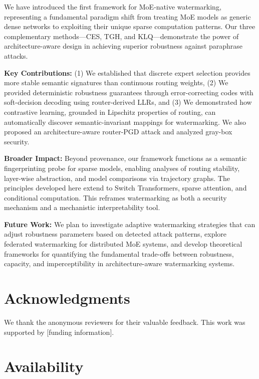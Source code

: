 We have introduced the first framework for MoE-native watermarking, representing a fundamental paradigm shift from treating MoE models as generic dense networks to exploiting their unique sparse computation patterns. Our three complementary methods—CES, TGH, and KLQ—demonstrate the power of architecture-aware design in achieving superior robustness against paraphrase attacks.

\textbf{Key Contributions:} (1) We established that discrete expert selection provides more stable semantic signatures than continuous routing weights, (2) We provided deterministic robustness guarantees through error-correcting codes with soft-decision decoding using router-derived LLRs, and (3) We demonstrated how contrastive learning, grounded in Lipschitz properties of routing, can automatically discover semantic-invariant mappings for watermarking. We also proposed an architecture-aware router-PGD attack and analyzed gray-box security.

\textbf{Broader Impact:} Beyond provenance, our framework functions as a semantic fingerprinting probe for sparse models, enabling analyses of routing stability, layer-wise abstraction, and model comparisons via trajectory graphs. The principles developed here extend to Switch Transformers, sparse attention, and conditional computation. This reframes watermarking as both a security mechanism and a mechanistic interpretability tool.

\textbf{Future Work:} We plan to investigate adaptive watermarking strategies that can adjust robustness parameters based on detected attack patterns, explore federated watermarking for distributed MoE systems, and develop theoretical frameworks for quantifying the fundamental trade-offs between robustness, capacity, and imperceptibility in architecture-aware watermarking systems.

\section*{Acknowledgments}

We thank the anonymous reviewers for their valuable feedback. This work was supported by [funding information].

\section*{Availability}

